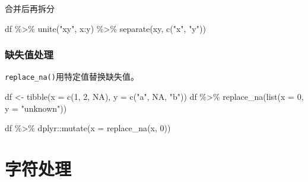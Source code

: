 \documentclass[
]{book}
\newenvironment{Shaded}{\begin{snugshade}}{\end{snugshade}}
\newcommand{\AttributeTok}[1]{\textcolor[rgb]{0.77,0.63,0.00}{#1}}
\newcommand{\ConstantTok}[1]{\textcolor[rgb]{0.00,0.00,0.00}{#1}}
\newcommand{\DecValTok}[1]{\textcolor[rgb]{0.00,0.00,0.81}{#1}}
\newcommand{\FunctionTok}[1]{\textcolor[rgb]{0.00,0.00,0.00}{#1}}
\newcommand{\NormalTok}[1]{#1}
\newcommand{\OtherTok}[1]{\textcolor[rgb]{0.56,0.35,0.01}{#1}}
\newcommand{\SpecialCharTok}[1]{\textcolor[rgb]{0.00,0.00,0.00}{#1}}
\newcommand{\StringTok}[1]{\textcolor[rgb]{0.31,0.60,0.02}{#1}}
\begin{document}
合并后再拆分

\begin{Shaded}
\begin{Highlighting}[]
\NormalTok{df }\SpecialCharTok{\%\textgreater{}\%}
  \FunctionTok{unite}\NormalTok{(}\StringTok{"xy"}\NormalTok{, x}\SpecialCharTok{:}\NormalTok{y) }\SpecialCharTok{\%\textgreater{}\%}
  \FunctionTok{separate}\NormalTok{(xy, }\FunctionTok{c}\NormalTok{(}\StringTok{"x"}\NormalTok{, }\StringTok{"y"}\NormalTok{))}
\end{Highlighting}
\end{Shaded}

\hypertarget{ux7f3aux5931ux503cux5904ux7406}{%
\subsection{缺失值处理}\label{ux7f3aux5931ux503cux5904ux7406}}

\texttt{replace\_na()}用特定值替换缺失值。

\begin{Shaded}
\begin{Highlighting}[]
\NormalTok{df }\OtherTok{\textless{}{-}} \FunctionTok{tibble}\NormalTok{(}\AttributeTok{x =} \FunctionTok{c}\NormalTok{(}\DecValTok{1}\NormalTok{, }\DecValTok{2}\NormalTok{, }\ConstantTok{NA}\NormalTok{), }\AttributeTok{y =} \FunctionTok{c}\NormalTok{(}\StringTok{"a"}\NormalTok{, }\ConstantTok{NA}\NormalTok{, }\StringTok{"b"}\NormalTok{))}
\NormalTok{df }\SpecialCharTok{\%\textgreater{}\%} \FunctionTok{replace\_na}\NormalTok{(}\FunctionTok{list}\NormalTok{(}\AttributeTok{x =} \DecValTok{0}\NormalTok{, }\AttributeTok{y =} \StringTok{"unknown"}\NormalTok{))}
\end{Highlighting}
\end{Shaded}

\begin{Shaded}
\begin{Highlighting}[]
\NormalTok{df }\SpecialCharTok{\%\textgreater{}\%}\NormalTok{ dplyr}\SpecialCharTok{::}\FunctionTok{mutate}\NormalTok{(}\AttributeTok{x =} \FunctionTok{replace\_na}\NormalTok{(x, }\DecValTok{0}\NormalTok{))}
\end{Highlighting}
\end{Shaded}

\hypertarget{ux5b57ux7b26ux5904ux7406}{%
\chapter{字符处理}\label{ux5b57ux7b26ux5904ux7406}}
\end{document}
